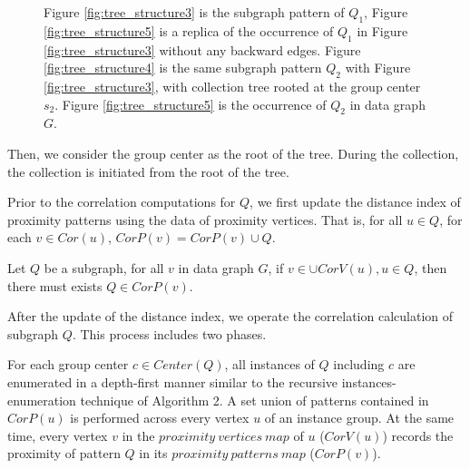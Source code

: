 \begin{figure}[t!]
\begin{subfigure}[b]{0.5\textwidth}
	\end{subfigure}
	\vspace{-2mm}
	\caption{\scriptsize Figure \ref{fig:tree_structure3} is the subgraph pattern of $Q_1$, Figure \ref{fig:tree_structure5} is a replica of the occurrence of $Q_1$ in Figure \ref{fig:tree_structure3} without any backward edges. Figure \ref{fig:tree_structure4} is the same subgraph pattern $Q_2$ with Figure \ref{fig:tree_structure3}, with collection tree rooted at the group center $s_2$. Figure \ref{fig:tree_structure5} is the occurrence of $Q_2$ in data graph $G$.}
	\label{fig:replica}
\end{figure}

%
Then, we consider the group center as the root of the tree. During the collection, the collection is initiated from the root of the tree.


\par Prior to the correlation computations for $Q$, we first update the distance index of proximity patterns using the data of proximity vertices. That is, for all $u\in Q$, for each $v\in Cor(u)$, $CorP(v)=CorP(v)\cup Q$.
\begin{lma}
	\label{lemma:distance bidirection relation between vertices and patterns}
	Let $Q$ be a subgraph, for all $v$ in data graph $G$, if $v\in \cup CorV(u),u\in Q$, then there must exists $Q\in CorP(v)$.
\end{lma}
\par After the update of the distance index, we operate the correlation calculation of subgraph $Q$. This process includes two phases.

 For each group center $c\in Center(Q)$, all instances of $Q$ including $c$ are enumerated in a depth-first manner similar to the recursive instances-enumeration technique of Algorithm 2. A set union of patterns contained in $CorP(u)$ is performed across every vertex $u$ of an instance group. At the same time, every vertex $v$ in the $proximity\ vertices\ map$ of $u$ ($CorV(u)$) records the proximity of pattern $Q$ in its $proximity\ patterns\ map$ ($CorP(v)$).

